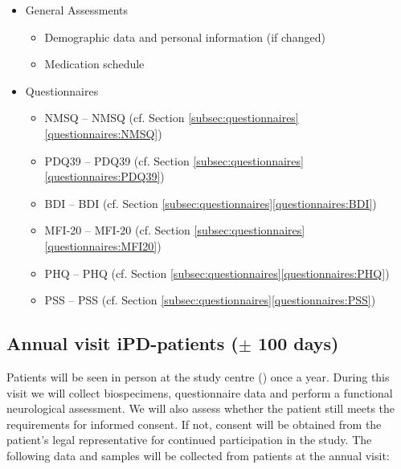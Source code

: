 \begin{itemize}[noitemsep,topsep=0pt]
\item General Assessments
\begin{itemize}[noitemsep,topsep=0pt]
\item Demographic data and personal information (if changed)
\item Medication schedule
\end{itemize}
\item Questionnaires
\begin{itemize}[noitemsep,topsep=0pt]
\item \acl{NMSQ} -- \acs{NMSQ} (cf. Section \ref{subsec:questionnaires}\ref{questionnaires:NMSQ})
\item \acl{PDQ39} -- \acs{PDQ39} (cf. Section \ref{subsec:questionnaires}\ref{questionnaires:PDQ39})
\item \acl{BDI} -- \acs{BDI} (cf. Section \ref{subsec:questionnaires}\ref{questionnaires:BDI})
\item \acl{MFI-20} -- \acs{MFI-20} (cf. Section \ref{subsec:questionnaires}\ref{questionnaires:MFI20})
\item \acl{PHQ} -- \acs{PHQ} (cf. Section \ref{subsec:questionnaires}\ref{questionnaires:PHQ})
\item \acl{PSS} -- \acs{PSS} (cf. Section \ref{subsec:questionnaires}\ref{questionnaires:PSS})
\end{itemize}
\end{itemize}

\subsection{Annual visit \ac{iPD}-patients ($\pm$ 100 days)}
Patients will be seen in person at the study centre (\UKM{}) once a year. During this visit we will collect biospecimens, questionnaire data and perform a functional neurological assessment. We will also assess whether the patient still meets the requirements for informed consent. If not, consent will be obtained from the patient's legal representative for continued participation in the study. The following data and samples will be collected from patients at the annual visit:

